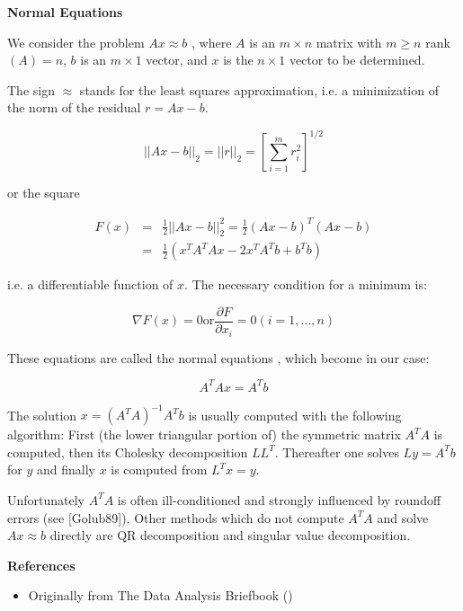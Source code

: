 \documentclass{article}
\begin{document}
{\bf Normal Equations}

We consider the problem $Ax \approx b$  , where $A$ is an $m \times n$ matrix with $m \ge n$ rank $(A)=n$, $b$ is an $m \times 1$ vector, and $x$ is the $n \times 1$ vector to be determined.

The sign $\approx$ stands for the least squares approximation, i.e. a minimization of the norm of the residual $r = Ax - b$.

$$ ||Ax-b||_2 = ||r||_2 = \left[ \sum_{i=1}^m r_i^2 \right]^{1/2}$$

or the square

\begin{eqnarray*}
 F(x) & = & \frac{1}{2} ||Ax-b||_2^2 = \frac{1}{2}(Ax-b)^T (Ax-b) \\
 & = & \frac{1}{2}(x^TA^TAx -2x^TA^Tb + b^Tb)
\end{eqnarray*}

i.e. a differentiable function of $x$. The necessary condition for a minimum is:

$$ \nabla F(x) =0 \text{or} \frac{\partial F}{\partial x_i} = 0 (i=1,\ldots,n) $$

These equations are called the normal equations , which become in our case:

$$ A^TAx = A^T b $$

The solution $x=(A^TA)^{-1}A^Tb$ is usually computed with the following algorithm: First (the lower triangular portion of) the symmetric matrix $A^TA$ is computed, then its Cholesky decomposition $LL^T$. Thereafter one solves $Ly=A^Tb$ for $y$ and finally $x$ is computed from $L^Tx=y$.

Unfortunately $A^TA$ is often ill-conditioned and strongly influenced by roundoff errors (see [Golub89]). Other methods which do not compute $A^TA$ and solve $Ax \approx b$ directly are QR decomposition and singular value decomposition.

{\bf References}

\begin{itemize}
\item Originally from The Data Analysis Briefbook ()
\end{itemize}
\end{document}
